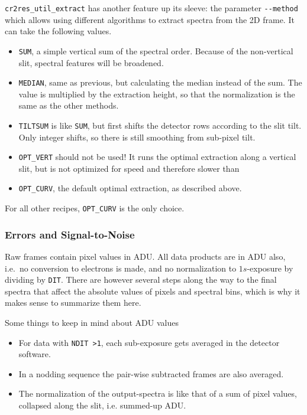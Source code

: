 \verb!cr2res_util_extract! has another feature up its sleeve: the parameter
\verb!--method! which allows using different algorithms to extract spectra from
the 2D frame. It can take the following values.
\begin{itemize}
    \item \verb!SUM!, a simple vertical sum of the spectral order. Because of
    the non-vertical slit, spectral features will be broadened.
    \item \verb!MEDIAN!, same as previous, but calculating the median instead of
    the sum. The value is multiplied by the extraction height, so that the
    normalization is the same as the other methods.
    \item \verb!TILTSUM! is like \verb!SUM!, but first shifts the detector rows
    according to the slit tilt. Only integer shifts, so there is still smoothing
    from sub-pixel tilt.
    \item \verb!OPT_VERT! should not be used! It runs the optimal extraction
    along a vertical slit, but is not optimized for speed and therefore slower
    than
    \item \verb!OPT_CURV!, the default optimal extraction, as described above.
\end{itemize}

For all other recipes, \verb!OPT_CURV! is the only choice.

\subsubsection{Errors and Signal-to-Noise}
\label{sec:errors}

Raw frames contain pixel values in ADU. All data products are in ADU also,
i.e.~no conversion to electrons is made, and no normalization to $1s$-exposure by
dividing by \verb!DIT!. There are however several steps along the way to the
final spectra that affect the absolute values of pixels and spectral bins, which
is why it makes sense to summarize them here.

Some things to keep in mind about ADU values
\begin{itemize}
    \item For data with \verb!NDIT >1!, each sub-exposure gets averaged in the
    detector software.
    \item In a nodding sequence the pair-wise subtracted frames are also
    averaged.
    \item The normalization of the output-spectra is like that of a sum of pixel
    values, collapsed along the slit, i.e. summed-up ADU.
\end{itemize}


